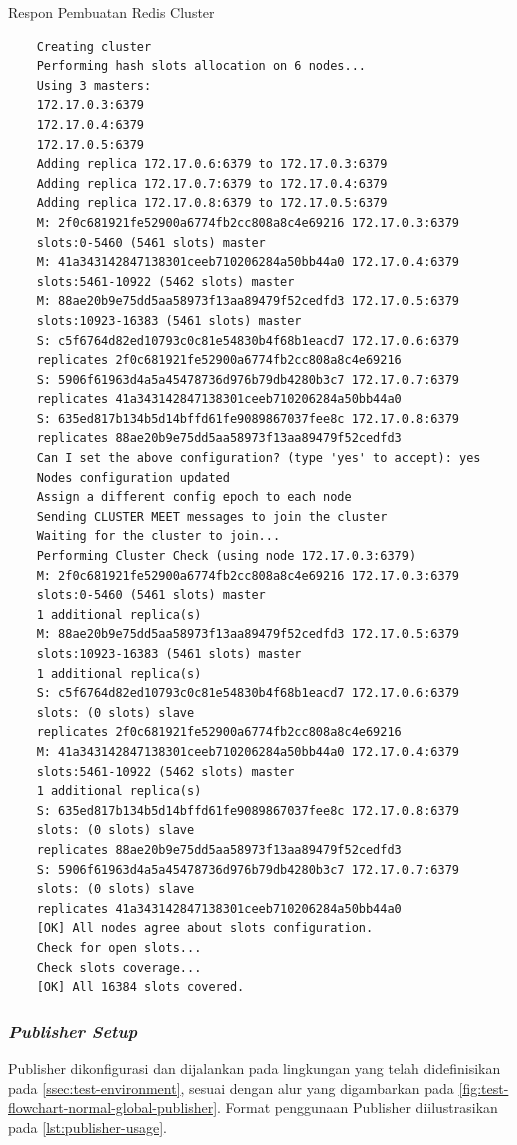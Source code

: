 \begin{listing}[!]
	\caption{Respon Pembuatan Redis Cluster}
	\label{lst:redis_trib_cluster_response}
	\begin{verbatim}
	Creating cluster
	Performing hash slots allocation on 6 nodes...
	Using 3 masters:
	172.17.0.3:6379
	172.17.0.4:6379
	172.17.0.5:6379
	Adding replica 172.17.0.6:6379 to 172.17.0.3:6379
	Adding replica 172.17.0.7:6379 to 172.17.0.4:6379
	Adding replica 172.17.0.8:6379 to 172.17.0.5:6379
	M: 2f0c681921fe52900a6774fb2cc808a8c4e69216 172.17.0.3:6379
	slots:0-5460 (5461 slots) master
	M: 41a343142847138301ceeb710206284a50bb44a0 172.17.0.4:6379
	slots:5461-10922 (5462 slots) master
	M: 88ae20b9e75dd5aa58973f13aa89479f52cedfd3 172.17.0.5:6379
	slots:10923-16383 (5461 slots) master
	S: c5f6764d82ed10793c0c81e54830b4f68b1eacd7 172.17.0.6:6379
	replicates 2f0c681921fe52900a6774fb2cc808a8c4e69216
	S: 5906f61963d4a5a45478736d976b79db4280b3c7 172.17.0.7:6379
	replicates 41a343142847138301ceeb710206284a50bb44a0
	S: 635ed817b134b5d14bffd61fe9089867037fee8c 172.17.0.8:6379
	replicates 88ae20b9e75dd5aa58973f13aa89479f52cedfd3
	Can I set the above configuration? (type 'yes' to accept): yes
	Nodes configuration updated
	Assign a different config epoch to each node
	Sending CLUSTER MEET messages to join the cluster
	Waiting for the cluster to join...
	Performing Cluster Check (using node 172.17.0.3:6379)
	M: 2f0c681921fe52900a6774fb2cc808a8c4e69216 172.17.0.3:6379
	slots:0-5460 (5461 slots) master
	1 additional replica(s)
	M: 88ae20b9e75dd5aa58973f13aa89479f52cedfd3 172.17.0.5:6379
	slots:10923-16383 (5461 slots) master
	1 additional replica(s)
	S: c5f6764d82ed10793c0c81e54830b4f68b1eacd7 172.17.0.6:6379
	slots: (0 slots) slave
	replicates 2f0c681921fe52900a6774fb2cc808a8c4e69216
	M: 41a343142847138301ceeb710206284a50bb44a0 172.17.0.4:6379
	slots:5461-10922 (5462 slots) master
	1 additional replica(s)
	S: 635ed817b134b5d14bffd61fe9089867037fee8c 172.17.0.8:6379
	slots: (0 slots) slave
	replicates 88ae20b9e75dd5aa58973f13aa89479f52cedfd3
	S: 5906f61963d4a5a45478736d976b79db4280b3c7 172.17.0.7:6379
	slots: (0 slots) slave
	replicates 41a343142847138301ceeb710206284a50bb44a0
	[OK] All nodes agree about slots configuration.
	Check for open slots...
	Check slots coverage...
	[OK] All 16384 slots covered.
	\end{verbatim}
\end{listing}


\subsubsection{\textit{Publisher Setup}}
Publisher dikonfigurasi dan dijalankan pada lingkungan yang telah didefinisikan pada \autoref{ssec:test-environment}, sesuai dengan alur yang digambarkan pada \autoref{fig:test-flowchart-normal-global-publisher}. Format penggunaan Publisher diilustrasikan pada \autoref{lst:publisher-usage}.


